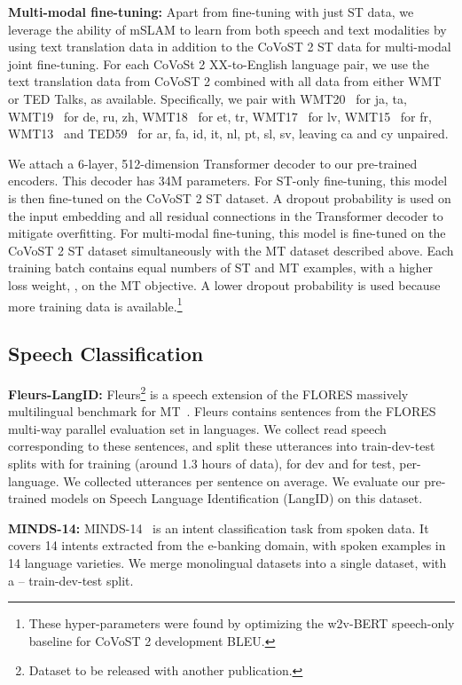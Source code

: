 \documentclass[nohyperref]{article}
\newcommand{\mslam}{mSLAM}
\begin{document}
\textbf{Multi-modal fine-tuning:} Apart from fine-tuning with just ST data, we leverage the ability of \mslam{} to learn from both speech and text modalities by using text translation data in addition to the CoVoST 2 ST data for multi-modal joint fine-tuning. For each CoVoSt 2 XX-to-English language pair, we use the text translation data from CoVoST 2 combined with all data from either WMT or TED Talks, as available. Specifically, we pair with WMT20~\cite{barrault-etal-2020-findings} for ja, ta,  WMT19~\cite{barrault-etal-2019-findings} for de, ru, zh, WMT18~\cite{bojar-etal-2018-findings} for et, tr,  WMT17~\cite{bojar-etal-2017-findings} for lv, WMT15~\cite{bojar-etal-2015-findings} for fr, WMT13~\cite{bojar-etal-2013-findings} and TED59~\cite{qi-etal-2018-pre} for ar, fa, id, it, nl, pt, sl, sv, leaving ca and cy unpaired. 


We attach a 6-layer, 512-dimension Transformer decoder to our pre-trained encoders. This decoder has 34M parameters.
For ST-only fine-tuning, this model is then fine-tuned on the CoVoST 2 ST dataset. A dropout probability  is used on the input embedding and all residual connections in the Transformer decoder to mitigate overfitting.
For multi-modal fine-tuning, this model is fine-tuned on the CoVoST 2 ST dataset simultaneously with the MT dataset described above. Each training batch contains equal numbers of ST and MT examples, with a higher loss weight, , on the MT objective.
A lower dropout probability  is used because more training data is available.\footnote{ These hyper-parameters were found by optimizing the w2v-BERT speech-only baseline for CoVoST 2 development BLEU.}

\subsection{Speech Classification}
\label{subsec:tasks-sc}
\textbf{Fleurs-LangID:} Fleurs\footnote{Dataset to be released with another publication.} is a speech extension of the FLORES massively multilingual benchmark for MT~\citep{goyal2021flores}. Fleurs contains  sentences from the FLORES multi-way parallel evaluation set in  languages. We collect read speech corresponding to these sentences, and split these utterances into train-dev-test splits with  for training (around 1.3 hours of data),  for dev and  for test, per-language. We collected   utterances per sentence on average. We evaluate our pre-trained models on Speech Language Identification (LangID) on this dataset.

\textbf{MINDS-14:} MINDS-14~\cite{gerz2021multilingual} is an intent classification task from spoken data. It covers 14 intents extracted from the e-banking domain, with spoken examples in 14 language varieties. We merge monolingual datasets into a  single dataset, with a -- train-dev-test split. 
\end{document}
